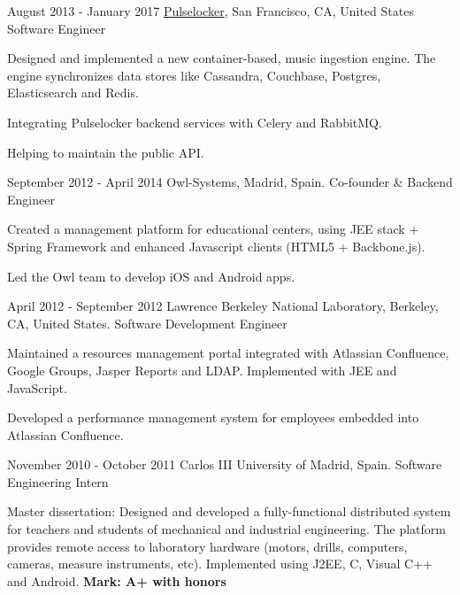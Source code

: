 \experience
  {August 2013 - January 2017}
  {\href{https://djtechtools.com/2018/04/04/beatport-acquires-pulselocker-relaunching-subscription-service-in-q3-2018/}{Pulselocker}, San Francisco, CA, United States}
  {Software Engineer}
  {\vspace{-1em}\begin{rlist}
    \item Designed and implemented a new container-based, music ingestion engine. The engine
    synchronizes data stores like Cassandra, Couchbase, Postgres, Elasticsearch and Redis.
    \item Integrating Pulselocker backend services with Celery and RabbitMQ.
    \item Helping to maintain the public API.
  \end{rlist}}

\experience
  {September 2012 - April 2014}
  {Owl-Systems, Madrid, Spain.}
  {Co-founder \& Backend Engineer}
  {\vspace{-1em}\begin{rlist}
    \item Created a management platform for educational centers, using JEE stack + Spring
    Framework and enhanced Javascript clients (HTML5 + Backbone.js).
    \item Led the Owl team to develop iOS and Android apps.
  \end{rlist}}

\experience
  {April 2012 - September 2012}
  {Lawrence Berkeley National Laboratory, Berkeley, CA, United States.}
  {Software Development Engineer}
  {\vspace{-1em}\begin{rlist}
    \item Maintained a resources management portal integrated with Atlassian Confluence,
    Google Groups, Jasper Reports and LDAP. Implemented with JEE and JavaScript.
    \item Developed a performance management system for employees embedded into Atlassian Confluence.
  \end{rlist}}

\experience
  {November 2010 - October 2011}
  {Carlos III University of Madrid, Spain.}
  {Software Engineering Intern}
  {\vspace{-1em}\begin{rlist}
    \item Master dissertation: Designed and developed a fully-functional distributed system
    for teachers and students of mechanical and industrial engineering. The platform provides
    remote access to laboratory hardware (motors, drills, computers, cameras, measure
    instruments, etc). Implemented using J2EE, C, Visual C++ and Android.
    \textbf{Mark: A+ with honors}
  \end{rlist}}

